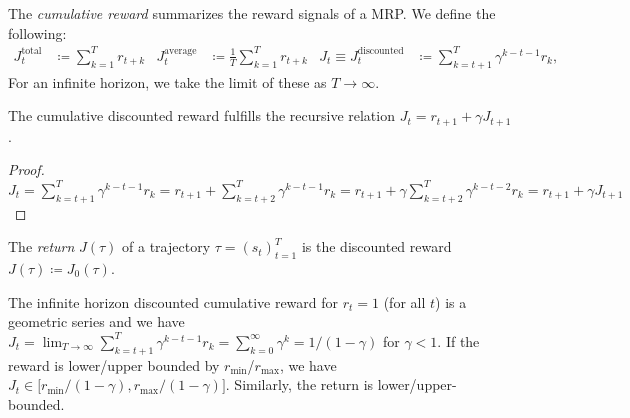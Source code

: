 			\begin{definition}
				The \emph{cumulative reward} summarizes the reward signals of a \ac{MRP}. We define the following:
				\begin{align}
					J_t^\mathrm{total} &\coloneqq \sum_{k = 1}^{T} r_{t + k} &
					J_t^\mathrm{average} &\coloneqq \frac{1}{T} \sum_{k = 1}^{T} r_{t + k} &
					J_t \equiv J_t^\mathrm{discounted} &\coloneqq \sum_{k = t + 1}^{T} \gamma^{k - t - 1} r_k,
				\end{align}
				For an infinite horizon, we take the limit of these as \(T \to \infty\).
			\end{definition}
			\begin{theorem}
				The cumulative discounted reward fulfills the recursive relation \( J_t = r_{t + 1} + \gamma J_{t + 1} \).
			\end{theorem}
			\begin{proof}
				\(
					J_t = \sum_{k = t + 1}^{T} \gamma^{k - t - 1} r_k
						= r_{t + 1} + \sum_{k = t + 2}^{T} \gamma^{k - t - 1} r_k
						= r_{t + 1} + \gamma \sum_{k = t + 2}^{T} \gamma^{k - t - 2} r_k
						= r_{t + 1} + \gamma J_{t + 1}
				\)
			\end{proof}
			\begin{definition}[Return]
				The \emph{return} \(J(\tau)\) of a trajectory \( \tau = (s_t)_{t = 1}^{T} \) is the discounted reward \( J(\tau) \coloneqq J_0(\tau) \).
			\end{definition}
			\begin{remark}
				The infinite horizon discounted cumulative reward for \(r_t = 1\) (for all \(t\)) is a geometric series and we have \( J_t = \lim_{T \to \infty} \sum_{k = t + 1}^{T} \gamma^{k - t - 1} r_k = \sum_{k = 0}^{\infty} \gamma^k = 1/(1 - \gamma) \) for \(\gamma < 1\). If the reward is lower/upper bounded by \(r_\mathrm{min}\)/\(r_\mathrm{max}\), we have \( J_t \in \bigl[ r_\mathrm{min}/(1 - \gamma), r_\mathrm{max}/(1 - \gamma) \bigr] \). Similarly, the return is lower/upper-bounded.
			\end{remark}

